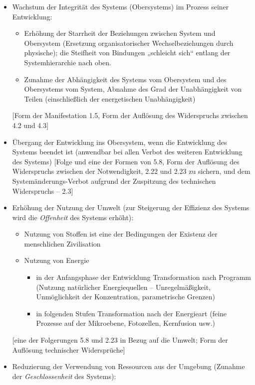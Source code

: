 \documentclass[11pt,a4paper]{article}
\begin{document}
\begin{itemize}
\item[5.8.] Wachstum der Integrität des Systems (Obersystems) im Prozess
  seiner Entwicklung:
  \begin{itemize}
    \item Erhöhung der Starrheit der Beziehungen zwischen System und
      Obersystem (Ersetzung organisatorischer Wechselbeziehungen durch
      physische); die Steifheit von Bindungen „schleicht sich“ entlang der
      Systemhierarchie nach oben.
    \item Zunahme der Abhängigkeit des Systems vom Obersystem und des
      Obersystems vom System, Abnahme des Grad der Unabhängigkeit von Teilen
      (einschließlich der energetischen Unabhängigkeit)
  \end{itemize}
[Form der Manifestation 1.5, Form der Auflösung des Widerspruchs zwischen 4.2
  und 4.3]
\item[5.9.] Übergang der Entwicklung ins Obersystem, wenn die Entwicklung des
  Systems beendet ist (anwendbar bei allen Verbot des weiteren Entwicklung des
  Systems) [Folge und eine der Formen von 5.8, Form der Auflösung des
    Widerspruchs zwischen der Notwendigkeit, 2.22 und 2.23 zu sichern, und dem
    Systemänderungs-Verbot aufgrund der Zuspitzung des technischen
    Widerspruchs -- 2.3]
\item[5.10.] Erhöhung der Nutzung der Umwelt (zur Steigerung der Effizienz des
  Systems wird die \emph{Offenheit} des Systems erhöht):
\begin{itemize}
  \item Nutzung von Stoffen ist eine der Bedingungen der Existenz der
    menschlichen Zivilisation
  \item Nutzung von Energie 
    \begin{itemize}
    \item in der Anfangsphase der Entwicklung Transformation nach Programm
      (Nutzung natürlicher Energiequellen -- Unregelmäßigkeit, Unmöglichkeit
      der Konzentration, parametrische Grenzen)
    \item in folgenden Stufen Transformation nach der Energieart (feine
      Prozesse auf der Mikroebene, Fotozellen, Kernfusion usw.)
    \end{itemize}
\end{itemize}
[eine der Folgerungen 5.8 und 2.23 in Bezug auf die Umwelt; Form der Auflösung
  technischer Widersprüche]
\item[5.11.] Reduzierung der Verwendung von Ressourcen aus der Umgebung
  (Zunahme der \emph{Geschlossenheit} des Systems):

\end{itemize}
\end{document}
